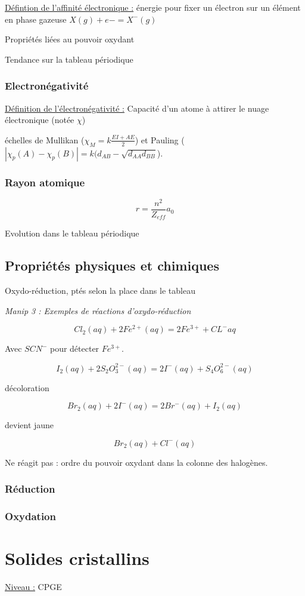 \documentclass{article}%
\begin{document}
\underline{Défintion de l'affinité électronique :} énergie pour fixer un électron sur un élément en phase gazeuse $X(g) + e- = X^-  (g)$

Propriétés liées au pouvoir oxydant

Tendance sur la tableau périodique

\subsubsection{Electronégativité}

\underline{Définition de l'électronégativité :} Capacité d'un atome à attirer le nuage électronique (notée $\chi$)

échelles de Mullikan ($\chi_M=k\frac{EI+AE}{2}$) et Pauling ($|\chi_p(A)-\chi_p(B)|=k(d_{AB}-\sqrt{d_{AA}d_{BB}}$).
\subsubsection{Rayon atomique}
\[r=\frac{n^2}{Z_{eff}}a_0\]

Evolution dans le tableau périodique
\subsection{Propriétés physiques et chimiques}

Oxydo-réduction, ptés selon la place dans le tableau

\textit{Manip 3 : Exemples de réactions d'oxydo-réduction}

\[Cl_2(aq) + 2 Fe^{2+}(aq) = 2 Fe^{3+} + CL^-{aq}\]

Avec $SCN^-$  pour détecter $Fe^{3+}$.

\[I_2(aq) +2 S_2O_3^{2-}(aq) = 2I^- (aq) + S_4O_6^{2-}(aq)\]

décoloration

\[Br_2(aq) + 2I^-(aq) = 2 Br^-(aq) + I_2(aq)\]

devient jaune

\[Br_2(aq)+Cl^-(aq)\]

Ne réagit pas : ordre du pouvoir oxydant dans la colonne des halogènes.

\subsubsection{Réduction}
\subsubsection{Oxydation}
\section{Solides cristallins}
\underline{Niveau :} CPGE 
\end{document}
